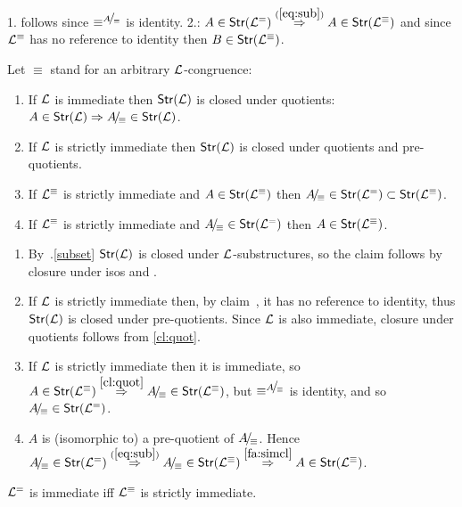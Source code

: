 \documentclass[12pt]{article}
\begin{document}
\begin{Proof}
1. follows since $\equiv^{A\!{\textstyle /}\!_{\equiv}}$ is identity.
2.: $A\in{\sf {Str}}({{\cal{L}}}^=)\stackrel{(\ref{eq:sub})}{\Rightarrow} A\in{\sf {Str}}({{\cal{L}}}^\equiv)$ and since ${{\cal{L}}}^\equiv$
has no reference to identity then $B\in{\sf {Str}}({{\cal{L}}}^\equiv)$.
\end{Proof}
%
\begin{Prop}Let $\equiv$ stand for an arbitrary ${{\cal{L}}}$-congruence:
\begin{enumerate}\MyLPar
\item\label{cl:quot}
If ${{\cal{L}}}$ is immediate then ${\sf {Str}}({{\cal{L}}})$ is closed under quotients: $A\in{\sf {Str}}({{\cal{L}}})
\Rightarrow A\!{\textstyle /}\!_{\equiv}\in{\sf {Str}}({{\cal{L}}})$.
\item\label{fa:simcl}
If ${{\cal{L}}}$ is strictly immediate then ${\sf {Str}}({{\cal{L}}})$ is closed under
quotients and pre-quotients.
\item
If ${{\cal{L}}}^\equiv$ is strictly immediate and $A\in{\sf {Str}}({{\cal{L}}}^\equiv)$  then
$A\!{\textstyle /}\!_{\equiv}\in {\sf {Str}}({{\cal{L}}}^=)\subset{\sf {Str}}({{\cal{L}}}^\equiv)$.
\item If ${{\cal{L}}}^\equiv$ is strictly immediate and $A\!{\textstyle /}\!_{\equiv}\in{\sf {Str}}({{\cal{L}}}^=)$  then
$A\in{\sf {Str}}({{\cal{L}}}^\equiv)$.
\end{enumerate}
\end{Prop}
\begin{Proof}
\begin{enumerate}\MyLPar
\item 
By~.\ref{subset} ${\sf {Str}}({{\cal{L}}})$ is closed under ${{\cal{L}}}$-substructures,
so the claim follows by closure under isos and .
\item If ${{\cal{L}}}$ is strictly immediate then, by claim~, it has no
reference to identity, thus ${\sf {Str}}({{\cal{L}}})$ is closed under pre-quotients. Since
${{\cal{L}}}$ is also immediate, closure under quotients follows from \ref{cl:quot}. 
\item If ${{\cal{L}}}$ is strictly immediate then it is immediate, so
$A\in{\sf {Str}}({{\cal{L}}}^\equiv) \stackrel{\ref{cl:quot}}{\Rightarrow} A\!{\textstyle /}\!_{\equiv}\in{\sf {Str}}({{\cal{L}}}^\equiv)$,
but $\equiv^{A\!{\textstyle /}\!_{\equiv}}$ is identity, and so $A\!{\textstyle /}\!_{\equiv}\in{\sf {Str}}({{\cal{L}}}^=)$.
\item $A$ is (isomorphic to) a pre-quotient of $A\!{\textstyle /}\!_{\equiv}$. Hence 
$A\!{\textstyle /}\!_{\equiv}\in{\sf {Str}}({{\cal{L}}}^=) \stackrel{(\ref{eq:sub})}{\Rightarrow} A\!{\textstyle /}\!_{\equiv}\in{\sf {Str}}({{\cal{L}}}^\equiv) \stackrel{\ref{fa:simcl}}{\Rightarrow} A\in{\sf {Str}}({{\cal{L}}}^\equiv)$.
\end{enumerate}
\end{Proof}
%
%
\begin{Theorem}
${{\cal{L}}}^=$ is immediate iff ${{\cal{L}}}^\equiv$ is strictly immediate.
\end{Theorem}
\end{document}
